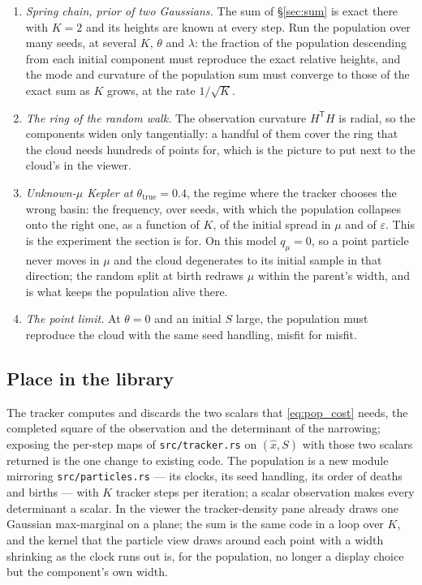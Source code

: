 \documentclass[11pt,a4paper]{article}
\newcommand{\T}{^{\mathsf T}}
\newcommand{\xh}{\hat{x}}
\newcommand{\eps}{\varepsilon}
\theoremstyle{plain}
\theoremstyle{definition}
\theoremstyle{remark}
\begin{document}
\begin{enumerate}[leftmargin=1.5em,nosep]
  \item \emph{Spring chain, prior of two Gaussians.} The sum of \S\ref{sec:sum} is exact there with $K=2$ and its heights are known at every step. Run the population over many seeds, at several $K$, $\theta$ and $\lambda$: the fraction of the population descending from each initial component must reproduce the exact relative heights, and the mode and curvature of the population sum must converge to those of the exact sum as $K$ grows, at the rate $1/\sqrt K$.
  \item \emph{The ring of the random walk.} The observation curvature $H\T H$ is radial, so the components widen only tangentially: a handful of them cover the ring that the cloud needs hundreds of points for, which is the picture to put next to the cloud's in the viewer.
  \item \emph{Unknown-$\mu$ Kepler at $\theta_{\text{true}}=0.4$}, the regime where the tracker chooses the wrong basin: the frequency, over seeds, with which the population collapses onto the right one, as a function of $K$, of the initial spread in $\mu$ and of $\eps$. This is the experiment the section is for. On this model $q_\mu=0$, so a point particle never moves in $\mu$ and the cloud degenerates to its initial sample in that direction; the random split at birth redraws $\mu$ within the parent's width, and is what keeps the population alive there.
  \item \emph{The point limit.} At $\theta=0$ and an initial $S$ large, the population must reproduce the cloud with the same seed handling, misfit for misfit.
\end{enumerate}

\subsection{Place in the library}
\label{sec:pop_lib}

The tracker computes and discards the two scalars that \eqref{eq:pop_cost} needs, the completed square of the observation and the determinant of the narrowing; exposing the per-step maps of \texttt{src/tracker.rs} on $(\xh,S)$ with those two scalars returned is the one change to existing code. The population is a new module mirroring \texttt{src/particles.rs} --- its clocks, its seed handling, its order of deaths and births --- with $K$ tracker steps per iteration; a scalar observation makes every determinant a scalar. In the viewer the tracker-density pane already draws one Gaussian max-marginal on a plane; the sum is the same code in a loop over $K$, and the kernel that the particle view draws around each point with a width shrinking as the clock runs out is, for the population, no longer a display choice but the component's own width.
\end{document}
